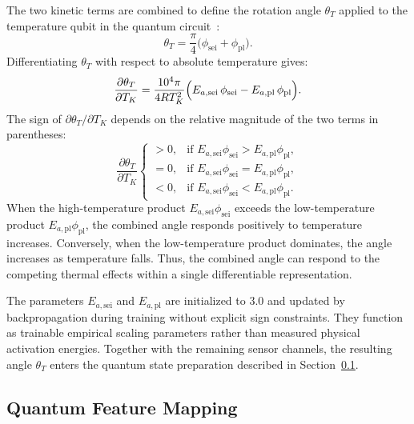 \documentclass[a4paper,fleqn]{cas-sc}
\begin{document}
The two kinetic terms are combined to define the rotation angle $\theta_T$ applied to the temperature qubit in the quantum circuit~\citep{gao2017efficient}:
\begin{equation}
\theta_T = \frac{\pi}{4}\bigl(\phi_{\mathrm{sei}} + \phi_{\mathrm{pl}}\bigr).
\label{eq:theta-temp}
\end{equation}
Differentiating $\theta_T$ with respect to absolute temperature gives:
\begin{equation}
\frac{\partial \theta_T}{\partial T_K} = \frac{10^4 \pi}{4 R T_K^2}\Bigl(E_{a,\mathrm{sei}}\,\phi_{\mathrm{sei}} - E_{a,\mathrm{pl}}\,\phi_{\mathrm{pl}}\Bigr).
\label{eq:dtheta_temp}
\end{equation}
The sign of $\partial \theta_T/\partial T_K$ depends on the relative magnitude of the two terms in parentheses:
\begin{equation}
\frac{\partial \theta_T}{\partial T_K} \begin{cases}
> 0, & \text{if } E_{a,\mathrm{sei}}\phi_{\mathrm{sei}} > E_{a,\mathrm{pl}}\phi_{\mathrm{pl}}, \\
= 0, & \text{if } E_{a,\mathrm{sei}}\phi_{\mathrm{sei}} = E_{a,\mathrm{pl}}\phi_{\mathrm{pl}}, \\
< 0, & \text{if } E_{a,\mathrm{sei}}\phi_{\mathrm{sei}} < E_{a,\mathrm{pl}}\phi_{\mathrm{pl}}.
\end{cases}
\label{eq:dtheta_cases}
\end{equation}
When the high-temperature product $E_{a,\mathrm{sei}}\phi_{\mathrm{sei}}$ exceeds the low-temperature product $E_{a,\mathrm{pl}}\phi_{\mathrm{pl}}$, the combined angle responds positively to temperature increases. Conversely, when the low-temperature product dominates, the angle increases as temperature falls. Thus, the combined angle can respond to the competing thermal effects within a single differentiable representation.

The parameters $E_{a,\mathrm{sei}}$ and $E_{a,\mathrm{pl}}$ are initialized to $3.0$ and updated by backpropagation during training without explicit sign constraints. They function as trainable empirical scaling parameters rather than measured physical activation energies. Together with the remaining sensor channels, the resulting angle $\theta_T$ enters the quantum state preparation described in Section~\ref{sec:quantum_mapping}.

\subsection{Quantum Feature Mapping}\label{sec:quantum_mapping}
\end{document}
